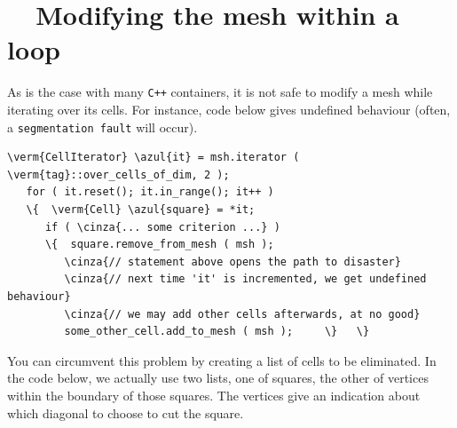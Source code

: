 \section{~~Modifying the mesh within a loop}\label{\numb section 10.\numb parag 3}

As is the case with many {\tt C++} containers, it is not safe to modify a mesh while
iterating over its cells.
For instance, code below gives undefined behaviour (often, a {\small\tt segmentation fault}
will occur).

\begin{Verbatim}[commandchars=\\\{\},formatcom=\small\tt,frame=single,
   label=incorrect code !,rulecolor=\color{coment},
   baselinestretch=0.94,framesep=2mm]
   \verm{CellIterator} \azul{it} = msh.iterator ( \verm{tag}::over_cells_of_dim, 2 );
   for ( it.reset(); it.in_range(); it++ )
   \{  \verm{Cell} \azul{square} = *it;
      if ( \cinza{... some criterion ...} )
      \{  square.remove_from_mesh ( msh );
         \cinza{// statement above opens the path to disaster}
         \cinza{// next time 'it' is incremented, we get undefined behaviour}
         \cinza{// we may add other cells afterwards, at no good}
         some_other_cell.add_to_mesh ( msh );     \}   \}
\end{Verbatim}

You can circumvent this problem by creating a list of cells to be eliminated.
In the code below, we actually use two lists, one of squares, the other of vertices within
the boundary of those squares.
The vertices give an indication about which diagonal to choose to cut the square.

